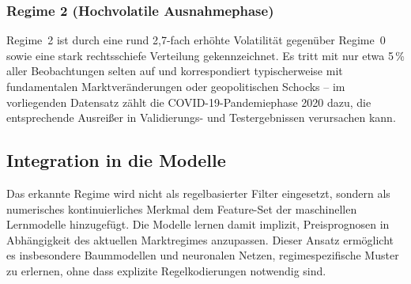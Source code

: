 \subsubsection{Regime 2 (Hochvolatile Ausnahmephase)}
Regime~2 ist durch eine rund 2,7-fach erhöhte Volatilität gegenüber Regime~0 sowie eine stark rechtsschiefe Verteilung gekennzeichnet.
Es tritt mit nur etwa 5\,\% aller Beobachtungen selten auf und korrespondiert typischerweise mit fundamentalen Marktveränderungen oder geopolitischen Schocks -- im vorliegenden Datensatz zählt die COVID-19-Pandemiephase 2020 dazu, die entsprechende Ausreißer in Validierungs- und Testergebnissen verursachen kann.

\subsection{Integration in die Modelle}
Das erkannte Regime wird nicht als regelbasierter Filter eingesetzt, sondern als numerisches kontinuierliches Merkmal dem Feature-Set der maschinellen Lernmodelle hinzugefügt.
Die Modelle lernen damit implizit, Preisprognosen in Abhängigkeit des aktuellen Marktregimes anzupassen.
Dieser Ansatz ermöglicht es insbesondere Baummodellen und neuronalen Netzen, regimespezifische Muster zu erlernen, ohne dass explizite Regelkodierungen notwendig sind.
